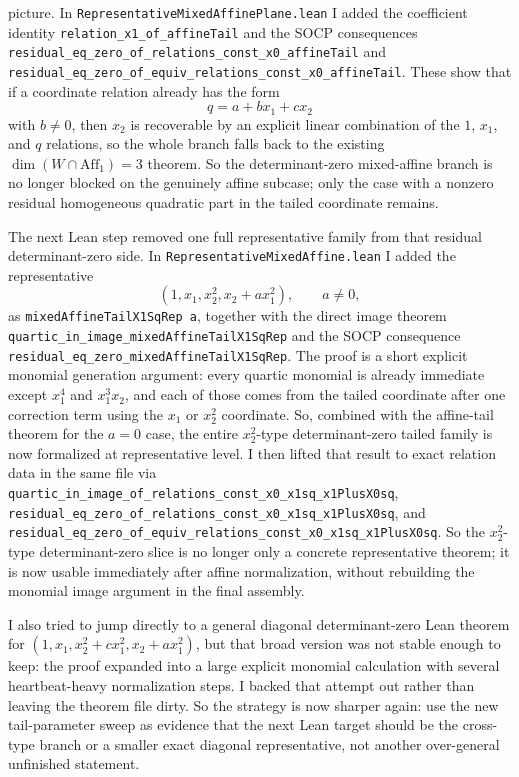\documentclass[11pt]{article}
\begin{document}
picture. In \texttt{RepresentativeMixedAffinePlane.lean} I added the coefficient
identity \texttt{relation\_x1\_of\_affineTail} and the SOCP consequences
\texttt{residual\_eq\_zero\_of\_relations\_const\_x0\_affineTail} and
\texttt{residual\_eq\_zero\_of\_equiv\_relations\_const\_x0\_affineTail}. These
show that if a coordinate relation already has the form
\[
  q = a + b x_1 + c x_2
\]
with \(b \neq 0\), then \(x_2\) is recoverable by an explicit linear
combination of the \(1\), \(x_1\), and \(q\) relations, so the whole branch
falls back to the existing \(\dim(W \cap \mathrm{Aff}_1)=3\) theorem. So the
determinant-zero mixed-affine branch is no longer blocked on the genuinely
affine subcase; only the case with a nonzero residual homogeneous quadratic
part in the tailed coordinate remains.

The next Lean step removed one full representative family from that residual
determinant-zero side. In
\texttt{RepresentativeMixedAffine.lean} I added the representative
\[
  (1,x_1,x_2^2,x_2 + a x_1^2), \qquad a \neq 0,
\]
as \texttt{mixedAffineTailX1SqRep a}, together with the direct image theorem
\texttt{quartic\_in\_image\_mixedAffineTailX1SqRep} and the SOCP consequence
\texttt{residual\_eq\_zero\_mixedAffineTailX1SqRep}. The proof is a short
explicit monomial generation argument: every quartic monomial is already
immediate except \(x_1^4\) and \(x_1^3x_2\), and each of those comes from the
tailed coordinate after one correction term using the \(x_1\) or \(x_2^2\)
coordinate. So, combined with the affine-tail theorem for the \(a=0\) case,
the entire \(x_2^2\)-type determinant-zero tailed family is now formalized at
representative level. I then lifted that result to exact relation data in the
same file via
\texttt{quartic\_in\_image\_of\_relations\_const\_x0\_x1sq\_x1PlusX0sq},
\texttt{residual\_eq\_zero\_of\_relations\_const\_x0\_x1sq\_x1PlusX0sq}, and
\texttt{residual\_eq\_zero\_of\_equiv\_relations\_const\_x0\_x1sq\_x1PlusX0sq}.
So the \(x_2^2\)-type determinant-zero slice is no longer only a concrete
representative theorem; it is now usable immediately after affine
normalization, without rebuilding the monomial image argument in the final
assembly.

I also tried to jump directly to a general diagonal determinant-zero Lean
theorem for \((1,x_1,x_2^2 + c x_1^2, x_2 + a x_1^2)\), but that broad version
was not stable enough to keep: the proof expanded into a large explicit
monomial calculation with several heartbeat-heavy normalization steps. I backed
that attempt out rather than leaving the theorem file dirty. So the strategy is
now sharper again: use the new tail-parameter sweep as evidence that the next
Lean target should be the cross-type branch or a smaller exact diagonal
representative, not another over-general unfinished statement.
\end{document}
